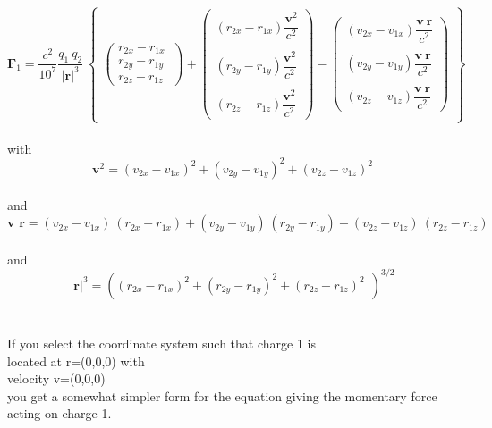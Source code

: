 \documentclass[10pt,titlepage]{article}
\begin{document}
\begin{equation}
\textbf{$\textbf{F}_1$}=\dfrac{c^2}{10^7}\dfrac{q_1 \ q_2}{\vert\textbf{r}\vert^3} \ 
\begin{Bmatrix}
\begin{pmatrix}r_{2x}-r_{1x}\ \\ r_{2y}-r_{1y}\\r_{2z}-r_{1z}\end{pmatrix}+
\begin{pmatrix}(r_{2x}-r_{1x})\dfrac{\textbf{v}^2}{c^2}\\ \\(r_{2y}-r_{1y})\dfrac{\textbf{v}^2}{c^2}\\ \\(r_{2z}-r_{1z})\dfrac{\textbf{v}^2}{c^2}\end{pmatrix}-
\begin{pmatrix}(v_{2x}-v_{1x})\dfrac{\textbf{v} \ \textbf{r}}{c^2}\\ \\(v_{2y}-v_{1y})\dfrac{\textbf{v} \ \textbf{r}}{c^2}\\ \\(v_{2z}-v_{1z})\dfrac{\textbf{v} \ \textbf{r}}{c^2}\end{pmatrix}
\end{Bmatrix}
\end{equation}\\
with  \begin{equation}
\textbf{v}^2=(v_{2x}-v_{1x})^2+(v_{2y}-v_{1y})^2+(v_{2z}-v_{1z})^2
\end{equation}  
\\and \begin{equation}
\textbf{v \ r}=(v_{2x}-v_{1x}) \ (r_{2x}-r_{1x})+(v_{2y}-v_{1y}) \ (r_{2y}-r_{1y})+(v_{2z}-v_{1z}) \ (r_{2z}-r_{1z})
\end{equation}
\\and   \begin{equation}
\vert\textbf{r}\vert^3=((r_{2x}-r_{1x})^2+(r_{2y}-r_{1y})^2+(r_{2z}-r_{1z})^2 \ \ )^{3/2}
\end{equation}
\\
\\
If you select the coordinate system such that charge 1 is \\ located at r=(0,0,0) with \\ velocity v=(0,0,0)\\
you get a somewhat simpler form for the equation giving the momentary force acting on charge 1.
\\
\\
\end{document}
